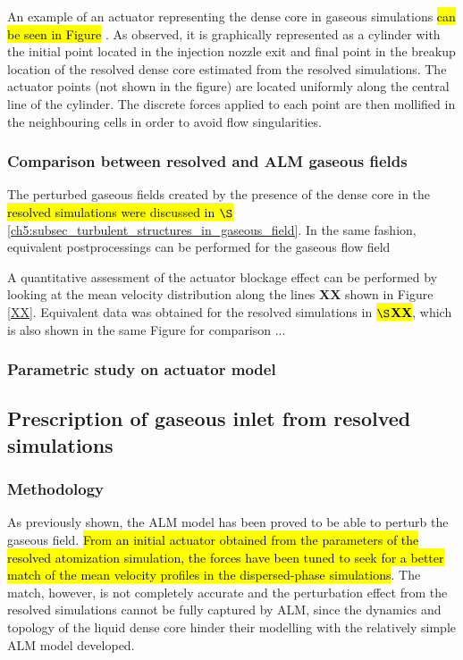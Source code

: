An example of an actuator representing the dense core in gaseous simulations \hl{can be seen in Figure }. As observed, it is graphically represented as a cylinder with the initial point located in the injection nozzle exit and final point in the breakup location of the resolved dense core estimated from the resolved simulations. The actuator points (not shown in the figure) are located uniformly along the central line of the cylinder. The discrete forces applied to each point are then mollified in the neighbouring cells in order to avoid flow singularities.

\subsubsection{Comparison between resolved and ALM gaseous fields}

The perturbed gaseous fields created by the presence of the dense core in the \hl{resolved simulations were discussed in $\S$}\ref{ch5:subsec_turbulent_structures_in_gaseous_field}. In the same fashion, equivalent postprocessings can be performed for the gaseous flow field 

A quantitative assessment of the actuator blockage effect can be performed by looking at the mean velocity distribution along the lines \textbf{XX} shown in Figure \ref{XX}. Equivalent data was obtained for the resolved simulations in \hl{\textbf{$\S$XX}}, which is also shown in the same Figure for comparison ... \\


\subsubsection{Parametric study on actuator model}


\subsection{Prescription of gaseous inlet from resolved simulations }
\label{subsec:ch6_jicf_lgs_gaseous_inlet_prescription}


\subsubsection{Methodology}

As previously shown, the ALM model has been proved to be able to perturb the gaseous field. \hl{From an initial actuator obtained from the parameters of the resolved atomization simulation, the forces have been tuned to seek for a better match of the mean velocity profiles in the dispersed-phase simulations}. The match, however, is not completely accurate and the perturbation effect from the resolved simulations cannot be fully captured by ALM, since the dynamics and topology of the liquid dense core hinder their modelling with the relatively simple ALM model developed. 

